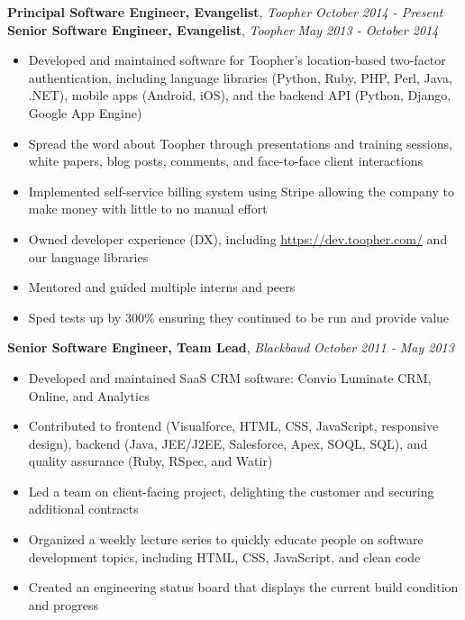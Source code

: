 \documentclass[9pt]{article}
\newenvironment{changemargin}[2]{%
  \begin{list}{}{%
    \setlength{\topsep}{0pt}%
    \setlength{\leftmargin}{#1}%
    \setlength{\rightmargin}{#2}%
    \setlength{\listparindent}{\parindent}%
    \setlength{\itemindent}{\parindent}%
    \setlength{\parsep}{\parskip}%
  }%
  \item[]}{\end{list}
}
\newcommand{\jobdescription}[1]{
	\begin{changemargin}{0.15in}{0.15in}
    \smallskip
		{#1}
    \medskip
	\end{changemargin}
}
\newcommand{\jobtitle}[3]{
	\textbf{#1}, \emph{#2} \hfill \emph{#3}\\
}
\newenvironment{body} {
	\vspace*{-16pt}
	\begin{changemargin}{-0.25in}{-0.5in}
  }	
	{\end{changemargin}
}
\begin{document}
\begin{body}
	\vspace{14pt}

  \jobtitle{Principal Software Engineer, Evangelist}{Toopher}{October 2014 - Present}
  \jobtitle{Senior Software Engineer, Evangelist}{Toopher}{May 2013 - October 2014}
  \jobdescription{
    \begin{itemize} \itemsep -0pt  %
      \item Developed and maintained software for Toopher's location-based two-factor authentication, including language libraries (Python, Ruby, PHP, Perl, Java, .NET), mobile apps (Android, iOS), and the backend API (Python, Django, Google App Engine)
      \item Spread the word about Toopher through presentations and training sessions, white papers, blog posts, comments, and face-to-face client interactions
      \item Implemented self-service billing system using Stripe allowing the company to make money with little to no manual effort
      \item Owned developer experience (DX), including \url{https://dev.toopher.com/} and our language libraries
      \item Mentored and guided multiple interns and peers
      \item Sped tests up by 300\% ensuring they continued to be run and provide value
    \end{itemize}
  }


  \jobtitle{Senior Software Engineer, Team Lead}{Blackbaud}{October 2011 - May 2013}
  \jobdescription{
  	\begin{itemize} \itemsep -0pt  %
  		\item Developed and maintained SaaS CRM software: Convio Luminate CRM, Online, and Analytics
      \item Contributed to frontend (Visualforce, HTML, CSS, JavaScript, responsive design), backend (Java, JEE/J2EE, Salesforce, Apex, SOQL, SQL), and quality assurance (Ruby, RSpec, and Watir)
      \item Led a team on client-facing project, delighting the customer and securing additional contracts
      \item Organized a weekly lecture series to quickly educate people on software development topics, including HTML, CSS, JavaScript, and clean code
      \item Created an engineering status board that displays the current build condition and progress
  	\end{itemize}
  }



\end{body}
\end{document}
